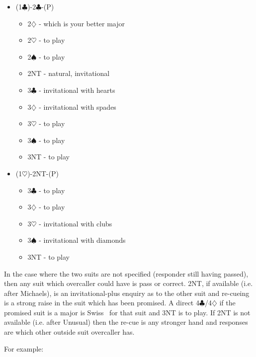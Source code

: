 \documentclass[a4paper,14pt]{extarticle}
\begin{document}
\begin{itemize}
\item (1$\clubsuit$)-2$\clubsuit$-(P)
	\begin{itemize}
	\item 2$\diamondsuit$ - which is your better major
	\item 2$\heartsuit$ - to play
	\item 2$\spadesuit$ - to play
	\item 2NT - natural, invitational
	\item 3$\clubsuit$ - invitational with hearts
	\item 3$\diamondsuit$ - invitational with spades
	\item 3$\heartsuit$ - to play
	\item 3$\spadesuit$ - to play
	\item 3NT - to play
	\end{itemize}
\item (1$\heartsuit$)-2NT-(P)
	\begin{itemize}
	\item 3$\clubsuit$ - to play
	\item 3$\diamondsuit$ - to play
	\item 3$\heartsuit$ - invitational with clubs
	\item 3$\spadesuit$ - invitational with diamonds
	\item 3NT - to play
	\end{itemize}
\end{itemize}

In the case where the two suits are not specified (responder still having
		passed), then any suit which overcaller could have is pass or correct.
2NT, if available (i.e. after Michaels), is an invitational-plus enquiry as to
the other suit and re-cueing is a strong raise in the suit which has been
promised. A direct 4$\clubsuit$/4$\diamondsuit$ if the promised suit is a major
is Swiss~ for that suit and 3NT is to play. If 2NT is not
available (i.e. after Unusual) then the re-cue is any stronger hand and
responses are which other outside suit overcaller has.

\newpage

For example:
\end{document}
